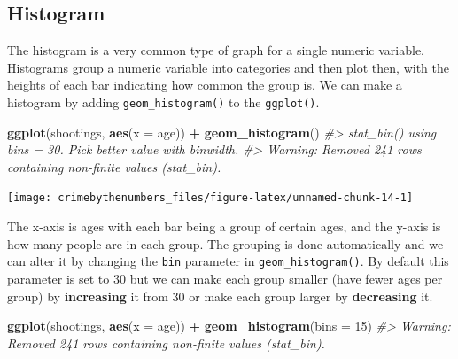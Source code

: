 \documentclass[
  12pt,
]{book}
\newenvironment{Shaded}{\begin{snugshade}}{\end{snugshade}}
\newcommand{\CommentTok}[1]{\textcolor[rgb]{0.37,0.37,0.37}{\textit{#1}}}
\newcommand{\DataTypeTok}[1]{\textcolor[rgb]{0.27,0.27,0.27}{#1}}
\newcommand{\DecValTok}[1]{\textcolor[rgb]{0.06,0.06,0.06}{#1}}
\newcommand{\KeywordTok}[1]{\textcolor[rgb]{0.27,0.27,0.27}{\textbf{#1}}}
\newcommand{\NormalTok}[1]{#1}
\newcommand{\OperatorTok}[1]{\textcolor[rgb]{0.43,0.43,0.43}{\textbf{#1}}}
\newcommand{\StringTok}[1]{\textcolor[rgb]{0.5,0.5,0.5}{#1}}
\begin{document}
\hypertarget{histogram}{%
\subsection{Histogram}\label{histogram}}

The histogram is a very common type of graph for a single numeric variable. Histograms group a numeric variable into categories and then plot then, with the heights of each bar indicating how common the group is. We can make a histogram by adding \texttt{geom\_histogram()} to the \texttt{ggplot()}.

\begin{Shaded}
\begin{Highlighting}[]
\KeywordTok{ggplot}\NormalTok{(shootings, }\KeywordTok{aes}\NormalTok{(}\DataTypeTok{x =}\NormalTok{ age)) }\OperatorTok{+}\StringTok{ }
\StringTok{  }\KeywordTok{geom\_histogram}\NormalTok{()}
\CommentTok{\#> \textasciigrave{}stat\_bin()\textasciigrave{} using \textasciigrave{}bins = 30\textasciigrave{}. Pick better value with \textasciigrave{}binwidth\textasciigrave{}.}
\CommentTok{\#> Warning: Removed 241 rows containing non{-}finite values (stat\_bin).}
\end{Highlighting}
\end{Shaded}

\begin{center}\texttt{[image: crimebythenumbers\_files/figure-latex/unnamed-chunk-14-1]} \end{center}

The x-axis is ages with each bar being a group of certain ages, and the y-axis is how many people are in each group. The grouping is done automatically and we can alter it by changing the \texttt{bin} parameter in \texttt{geom\_histogram()}. By default this parameter is set to 30 but we can make each group smaller (have fewer ages per group) by \textbf{increasing} it from 30 or make each group larger by \textbf{decreasing} it.

\begin{Shaded}
\begin{Highlighting}[]
\KeywordTok{ggplot}\NormalTok{(shootings, }\KeywordTok{aes}\NormalTok{(}\DataTypeTok{x =}\NormalTok{ age)) }\OperatorTok{+}\StringTok{ }
\StringTok{  }\KeywordTok{geom\_histogram}\NormalTok{(}\DataTypeTok{bins =} \DecValTok{15}\NormalTok{)}
\CommentTok{\#> Warning: Removed 241 rows containing non{-}finite values (stat\_bin).}
\end{Highlighting}
\end{Shaded}
\end{document}
